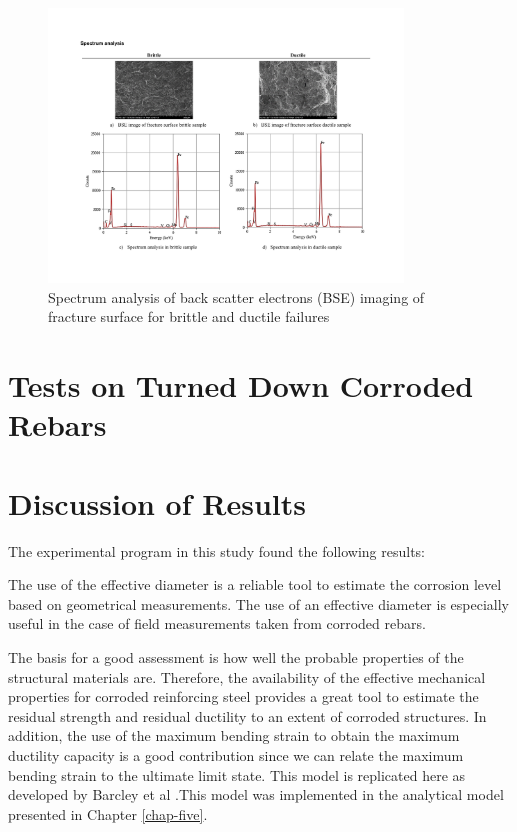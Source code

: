 \begin{figure}[htbp]
	\centering
	\includegraphics[width=0.84\textwidth]{VAC Thesis 2.0/Chapter-4/figs/BBT_SpectrumAnalysis.pdf}
	\caption{Spectrum analysis of back scatter electrons (BSE) imaging of fracture surface for brittle and ductile failures}
	\label{fig:SpectrumAnalysis}
\end{figure}

\newpage

\section{Tests on Turned Down Corroded Rebars}

\section{Discussion of Results}

The experimental program in this study found the following results:

The use of the effective diameter is a reliable tool to estimate the corrosion level based on geometrical measurements. The use of an effective diameter is especially useful in the case of field measurements taken from corroded rebars. 

The basis for a good assessment is how well the probable properties of the structural materials are. Therefore, the availability of the effective mechanical properties for corroded reinforcing steel provides a great tool to estimate the residual strength and residual ductility to an extent of corroded structures. In addition, the use of the maximum bending strain to obtain the maximum ductility capacity is a good contribution since we can relate the maximum bending strain to the ultimate limit state. This model is replicated here as  developed by Barcley et al \cite{Barcley2019}.This model was implemented in the analytical model presented in Chapter \ref{chap-five}. 

